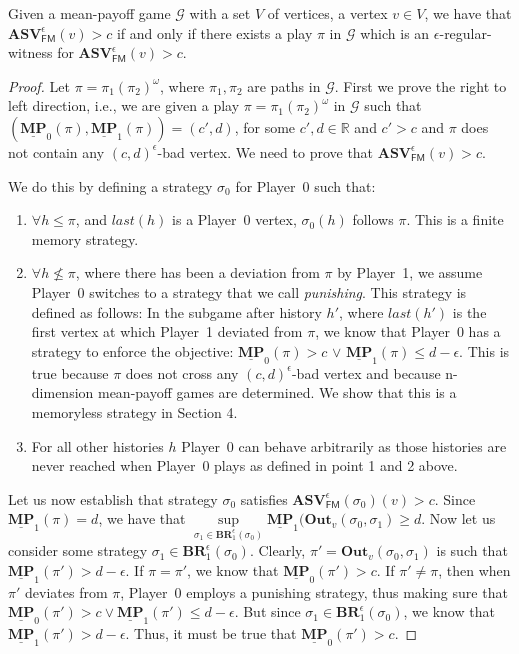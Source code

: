 \begin{lemma}
\label{lemWitnessASVForFinStrat}
Given a mean-payoff game $\mathcal{G}$ with a set $V$ of vertices, a vertex $v \in V$, we have that $\mathbf{ASV}_{\mathsf{FM}}^{\epsilon}(v) > c$ if and only if there exists a play $\pi$ in $\mathcal{G}$ which is an $\epsilon$-regular-witness for $\mathbf{ASV}_{\mathsf{FM}}^{\epsilon}(v) > c$.
\end{lemma}
\begin{proof}
	Let $\pi = \pi_1 (\pi_2)^{\omega}$, where $\pi_1, \pi_2$ are paths in $\mathcal{G}$.
	First we prove the right to left direction, i.e., we are given a  play $\pi = \pi_1 (\pi_2)^{\omega}$ in $\mathcal{G}$ such that  $(\underline{\mathbf{MP}}_0(\pi), \underline{\mathbf{MP}}_1(\pi)) = (c', d)$, for some $c', d \in \mathbb{R}$ and $c' > c$ and $\pi$ does not contain any $(c,d)^{\epsilon}$-bad vertex. We need to prove that $\mathbf{ASV}_{\mathsf{FM}}^{\epsilon}(v) > c$.
	
	We do this by defining a strategy $\sigma_0$ for Player~0 such that:
	\begin{enumerate}
		\item $\forall h \leqslant \pi$, and $last(h)$ is a Player~0 vertex, $\sigma_0(h)$ follows $\pi$. This is a finite memory strategy.
		\item $\forall h \nleqslant \pi$, where there has been a deviation from $\pi$ by Player~1, we assume Player~0 switches to a strategy that we call \textit{punishing}. This strategy is defined as follows: In the subgame after history $h'$, where $last(h')$ is the first vertex at which Player~1 deviated from $\pi$, we know that Player~0 has a strategy to enforce the objective: $\underline{\mathbf{MP}}_0(\pi) > c$ $\lor$ $ \underline{\mathbf{MP}}_1(\pi) \leqslant d-\epsilon$. This is true because $\pi$ does not cross any $(c,d)^{\epsilon}$-bad vertex and because n-dimension mean-payoff games are determined. We show that this is a memoryless strategy in Section 4.
		\item For all other histories $h$ Player~0 can behave arbitrarily as those histories are never reached when Player~0 plays as defined in point 1 and 2 above.
	\end{enumerate}
	
	Let us now establish that strategy $\sigma_0$ satisfies $\mathbf{ASV}_{\mathsf{FM}}^{\epsilon}(\sigma_0)(v) > c$. Since $\underline{\mathbf{MP}}_1(\pi) = d$, we have that $\sup\limits_{\sigma_1 \in \mathbf{BR}^{\epsilon}_1(\sigma_0)} \underline{\mathbf{MP}}_1(\mathbf{Out}_v(\sigma_0, \sigma_1) \geqslant d$. Now let us consider some strategy $\sigma_1 \in \mathbf{BR}_1^{\epsilon}(\sigma_0)$. Clearly, $\pi' = \mathbf{Out}_v(\sigma_0, \sigma_1)$ is such that $\underline{\mathbf{MP}}_1(\pi') > d-\epsilon$. If $\pi = \pi'$, we know that $\underline{\mathbf{MP}}_0(\pi') > c$. If $\pi' \neq \pi$, then when $\pi'$ deviates from $\pi$, Player~0 employs a punishing strategy, thus making sure that $\underline{\mathbf{MP}}_0(\pi') > c \lor \underline{\mathbf{MP}}_1(\pi') \leqslant d - \epsilon$. But since $\sigma_1 \in \mathbf{BR}_1^{\epsilon}(\sigma_0)$, we know that $\underline{\mathbf{MP}}_1(\pi') > d - \epsilon$. Thus, it must be true that $\underline{\mathbf{MP}}_0(\pi') > c$.
	

\end{proof}
